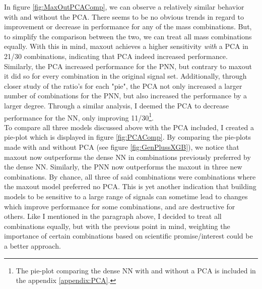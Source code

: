 In figure \ref{fig:MaxOutPCAComp}, we can observe a relatively similar behavior with and without the \ac{PCA}. There seems to be no obvious trends in regard 
to improvement or decrease in performance for any of the mass combinations. But, to simplify the comparison between the two, we can treat all mass combinations
equally. With this in mind, maxout achieves a higher sensitivity \emph{with} a \ac{PCA} in 21/30 combinations, indicating that \ac{PCA} indeed increased performance.
Similarly, the \ac{PCA} increased performance for the \ac{PNN}, but contrary to maxout it did so for every combination in the original signal set. Additionally,
through closer study of the ratio's for each "pie", the \ac{PCA} not only increased a larger number of combinations for the \ac{PNN}, but also increased the performance
by a larger degree. Through a similar analysis, I deemed the \ac{PCA} to decrease performance for the \ac{NN}, only improving 11/30\footnote{The pie-plot comparing the 
dense \ac{NN} with and without a \ac{PCA} is included in the appendix \ref{appendix:PCA}.}. 
\\
To compare all three models discussed above with the \ac{PCA} included, I created a pie-plot which is displayed in figure \ref{fig:PCAComp}. By comparing 
the pie-plots made with and without \ac{PCA} (see figure \ref{fig:GenPlussXGB}), we notice that maxout now outperforms the dense \ac{NN} in combinations 
previously preferred by the dense \ac{NN}. Similarly, the \ac{PNN} now outperforms the maxout in three new combinations. By chance, all three of said combinations 
were combinations where the maxout model preferred no \ac{PCA}. This is yet another indication that building models to be sensitive to a large range of signals can 
sometime lead to changes which improve performance for some combinations, and are destructive for others. Like I mentioned in the paragraph above, I decided 
to treat all combinations equally, but with the previous point in mind, weighting the importance of certain combinations based on scientific promise/interest
could be a better approach. 

